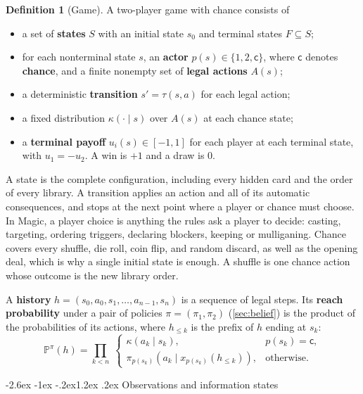 \documentclass[11pt,a4paper]{article}
\makeatletter
\renewcommand\subsection{\@startsection{subsection}{2}{\z@}
  {-2.6ex \@plus -1ex \@minus -.2ex}{1.2ex \@plus .2ex}
  {\normalfont\large\sffamily\bfseries\color{ink}}}
\theoremstyle{plain}
\theoremstyle{definition}
\newtheorem{definition}{Definition}
\newcommand{\term}[1]{\textbf{#1}}
\newcommand{\chance}{\mathsf c}
\newcommand{\Prob}{\mathbb P}
\makeatother
\begin{document}
\begin{definition}[Game]
\label{def:game}
A two-player game with chance consists of
\begin{itemize}
\item a set of \term{states} $S$ with an initial state $s_0$ and terminal states $F\subseteq S$;
\item for each nonterminal state $s$, an \term{actor} $p(s)\in\{1,2,\chance\}$,
  where $\chance$ denotes \term{chance}, and a finite nonempty set of
  \term{legal actions} $A(s)$;
\item a deterministic \term{transition} $s'=\tau(s,a)$ for each legal action;
\item a fixed distribution $\kappa(\cdot\mid s)$ over $A(s)$ at each chance state;
\item a \term{terminal payoff} $u_i(s)\in[-1,1]$ for each player at each
  terminal state, with $u_1=-u_2$. A win is $+1$ and a draw is $0$.
\end{itemize}
\end{definition}

A state is the complete configuration, including every hidden card and the
order of every library. A transition applies an action and all of its
automatic consequences, and stops at the next point where a player or chance
must choose. In Magic, a player choice is anything the rules ask a player to
decide: casting, targeting, ordering triggers, declaring blockers, keeping or
mulliganing. Chance covers every shuffle, die roll, coin flip, and random
discard, as well as the opening deal, which is why a single initial state is
enough. A shuffle is one chance action whose outcome is the new library order.

A \term{history} $h=(s_0,a_0,s_1,\dots,a_{n-1},s_n)$ is a sequence of legal
steps. Its \term{reach probability} under a pair of policies
$\pi=(\pi_1,\pi_2)$ (\cref{sec:belief}) is the product of the probabilities of
its actions, where $h_{\le k}$ is the prefix of $h$ ending at $s_k$:
\begin{equation}
\Prob^{\pi}(h)=\prod_{k<n}\;
\begin{cases}
\kappa(a_k\mid s_k), & p(s_k)=\chance,\\
\pi_{p(s_k)}(a_k\mid x_{p(s_k)}(h_{\le k})), & \text{otherwise.}
\end{cases}
\label{eq:reach}
\end{equation}

\subsection{Observations and information states}
\end{document}

